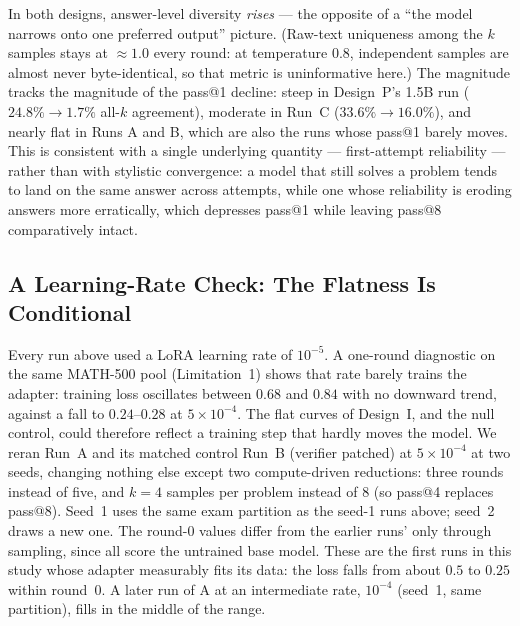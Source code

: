 \documentclass[runningheads]{llncs}
\begin{document}
In both designs, answer-level diversity \emph{rises} --- the opposite of a
``the model narrows onto one preferred output'' picture. (Raw-text
uniqueness among the $k$ samples stays at $\approx\!1.0$ every round: at
temperature $0.8$, independent samples are almost never byte-identical, so
that metric is uninformative here.) The magnitude tracks the magnitude of
the pass@1 decline: steep in Design~P's 1.5B run ($24.8\%\to1.7\%$ all-$k$
agreement), moderate in Run~C ($33.6\%\to16.0\%$), and nearly flat in Runs
A and B, which are also the runs whose pass@1 barely moves. This is
consistent with a single underlying quantity --- first-attempt reliability
--- rather than with stylistic convergence: a model that still solves a
problem tends to land on the same answer across attempts, while one whose
reliability is eroding answers more erratically, which depresses pass@1
while leaving pass@8 comparatively intact.

\subsection{A Learning-Rate Check: The Flatness Is Conditional}
\label{sec:lrcheck}

Every run above used a LoRA learning rate of $10^{-5}$. A one-round diagnostic
on the same MATH-500 pool (Limitation~1) shows that rate barely trains the
adapter: training loss oscillates between $0.68$ and $0.84$ with no downward
trend, against a fall to $0.24$--$0.28$ at $5\times10^{-4}$. The flat curves
of Design~I, and the null control, could therefore reflect a training step
that hardly moves the model. We reran Run~A and its matched control Run~B
(verifier patched) at $5\times10^{-4}$ at two seeds, changing nothing else
except two compute-driven reductions: three rounds instead of five, and $k=4$
samples per problem instead of $8$ (so pass@4 replaces pass@8). Seed~1 uses
the same exam partition as the seed-1 runs above; seed~2 draws a new one. The
round-0 values differ from the earlier runs' only through sampling, since all
score the untrained base model. These are the first runs in this study whose
adapter measurably fits its data: the loss falls from about $0.5$ to $0.25$
within round~0. A later run of A at an intermediate rate, $10^{-4}$ (seed~1,
same partition), fills in the middle of the range.
\end{document}
